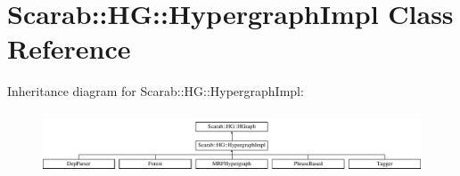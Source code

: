 \hypertarget{class_scarab_1_1_h_g_1_1_hypergraph_impl}{
\section{Scarab::HG::HypergraphImpl Class Reference}
\label{class_scarab_1_1_h_g_1_1_hypergraph_impl}
}
Inheritance diagram for Scarab::HG::HypergraphImpl:\begin{figure}[H]
\begin{center}
\leavevmode
\includegraphics[height=1.85635cm]{class_scarab_1_1_h_g_1_1_hypergraph_impl}
\end{center}
\end{figure}
